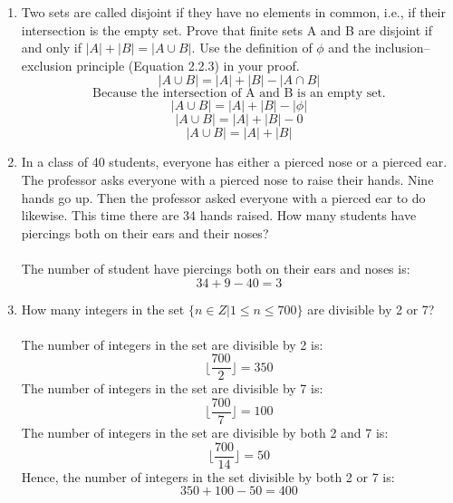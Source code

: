 \documentclass[12pt]{article}
\begin{document}
\begin{enumerate}
  \newpage 
  \item Two sets are called disjoint if they have no elements in common, i.e., if their intersection is the empty set. Prove that finite sets A and B are disjoint if and only if $|A| + |B| = |A \cup B|$. Use the definition of $\phi$ and the inclusion–exclusion principle (Equation 2.2.3) in your proof.
    \[|A \cup B| = |A| + |B| - |A \cap B|\]
    \[\text{Because the intersection of A and B is an empty set.}\]
    \[|A \cup B| = |A| + |B| - |\phi|\]
    \[|A \cup B| = |A| + |B| - 0\]
    \[|A \cup B| = |A| + |B|\]
  \item In a class of 40 students, everyone has either a pierced nose or a pierced ear. The professor asks everyone with a pierced nose to raise their hands. Nine hands go up. Then the professor asked everyone with a pierced ear to do likewise. This time there are 34 hands raised. How many students have piercings both on their ears and their noses?\\~\\
  The number of student have piercings both on their ears and noses is:
  \[34 + 9 - 40 = 3\]
  \item How many integers in the set $\{n \in Z | 1 \leq n \leq 700\}$ are divisible by 2 or 7?\\~\\
  The number of integers in the set are divisible by 2 is:
    \[\lfloor\frac{700}{2}\rfloor = 350\]
  The number of integers in the set are divisible by 7 is:
    \[\lfloor\frac{700}{7}\rfloor = 100\]
  The number of integers in the set are divisible by both 2 and 7 is:
    \[\lfloor\frac{700}{14}\rfloor = 50\]
  Hence, the number of integers in the set divisible by both 2 or 7 is:
    \[350 + 100 - 50 = 400\]


\end{enumerate}
\end{document}
